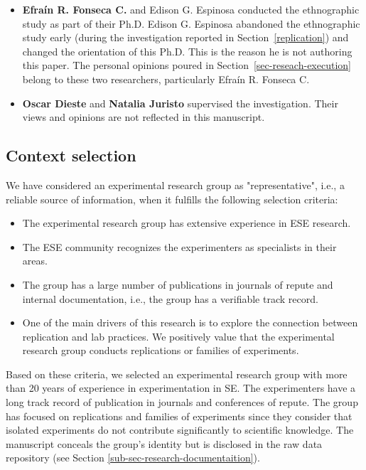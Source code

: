 \begin{itemize}
\item \textbf{Efra\'in R. Fonseca C.} and Edison G. Espinosa conducted the ethnographic study as part of their Ph.D. Edison G. Espinosa abandoned the ethnographic study early (during the investigation reported in Section~\ref{replication}) and changed the orientation of this Ph.D. This is the reason he is not authoring this paper. The personal opinions poured in Section~\ref{sec-reseach-execution} belong to these two researchers, particularly Efra\'in R. Fonseca C.
\item \textbf{Oscar Dieste} and \textbf{Natalia Juristo} supervised the investigation. Their views and opinions are not reflected in this manuscript.
\end{itemize}

\subsection{Context selection}
We have considered an experimental research group as "representative", i.e., a reliable source of information, when it fulfills the following selection criteria:

\begin{itemize}
	\item The experimental research group has extensive experience in ESE research.
	\item The ESE community recognizes the experimenters as specialists in their areas.
	\item The group has a large number of publications in journals of repute and internal documentation, i.e., the group has a verifiable track record.
\item One of the main drivers of this research is to explore the connection between replication and lab practices. We positively value that the experimental research group conducts replications or families of experiments.
\end{itemize}

Based on these criteria, we selected an experimental research group with more than 20 years of experience in experimentation in SE. The experimenters have a long track record of publication in journals and conferences of repute. The group has focused on replications and families of experiments since they consider that isolated experiments do not contribute significantly to scientific knowledge. The manuscript conceals the group's identity but is disclosed in the raw data repository (see Section \ref{sub-sec-research-documentaition}).

